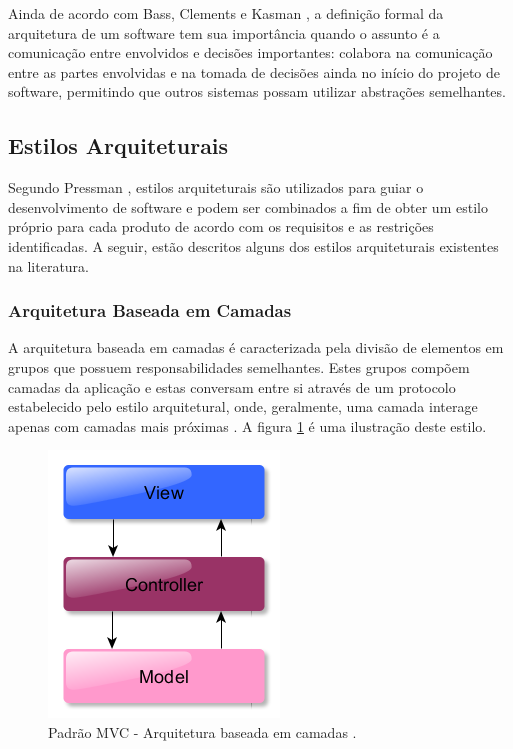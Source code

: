 Ainda de acordo com Bass, Clements e Kasman \cite{bass_software_archi_practice_2003}, a definição formal da arquitetura de um software tem sua importância quando o assunto é a comunicação entre envolvidos e decisões importantes: colabora na comunicação entre as partes envolvidas e na tomada de decisões ainda no início do projeto de software, permitindo que outros sistemas possam utilizar abstrações semelhantes.

\subsection{Estilos Arquiteturais}
Segundo Pressman \cite{pressman2006engenharia}, estilos arquiteturais são utilizados para guiar o desenvolvimento de software e podem ser combinados a fim de obter um estilo próprio para cada produto de acordo com os requisitos e as restrições identificadas. A seguir, estão descritos alguns dos estilos arquiteturais existentes na literatura.

\subsubsection{Arquitetura Baseada em Camadas}
A arquitetura baseada em camadas é caracterizada pela divisão de elementos em grupos que possuem responsabilidades semelhantes. Estes grupos compõem camadas da aplicação e estas conversam entre si através de um protocolo estabelecido pelo estilo arquitetural, onde, geralmente, uma camada interage apenas com camadas mais próximas \cite{pressman2006engenharia}. A figura \ref{modelo_mvc} é uma ilustração deste estilo.

\begin{figure}[htb]
\centering
\includegraphics[scale=0.5]{figuras/modelo_mvc.PNG}
\caption{Padrão MVC - Arquitetura baseada em camadas \cite{pressman2006engenharia}.}
\label{modelo_mvc}
\end{figure}

